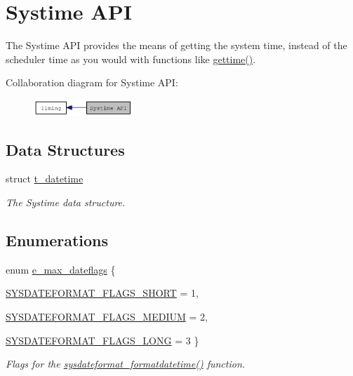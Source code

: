 \hypertarget{group__systime}{
\section{Systime API}
\label{group__systime}
}


The Systime API provides the means of getting the system time, instead of the scheduler time as you would with functions like \hyperlink{group__clocks_gabe5d8b1c9f260d13734a328b2a60ff69}{gettime()}.  


Collaboration diagram for Systime API:\nopagebreak
\begin{figure}[H]
\begin{center}
\leavevmode
\includegraphics[width=106pt]{group__systime}
\end{center}
\end{figure}
\subsection*{Data Structures}
\begin{DoxyCompactItemize}
\item 
struct \hyperlink{structt__datetime}{t\_\-datetime}
\begin{DoxyCompactList}\small\item\em The Systime data structure. \item\end{DoxyCompactList}\end{DoxyCompactItemize}
\subsection*{Enumerations}
\begin{DoxyCompactItemize}
\item 
enum \hyperlink{group__systime_ga26a8d02aa000843530dcb2d350766951}{e\_\-max\_\-dateflags} \{ \par
\hyperlink{group__systime_gga26a8d02aa000843530dcb2d350766951a03c806745c3aad02d768797ead649e20}{SYSDATEFORMAT\_\-FLAGS\_\-SHORT} =  1, 
\par
\hyperlink{group__systime_gga26a8d02aa000843530dcb2d350766951a44be9bae61adf4f4b802989465768d63}{SYSDATEFORMAT\_\-FLAGS\_\-MEDIUM} =  2, 
\par
\hyperlink{group__systime_gga26a8d02aa000843530dcb2d350766951a0cdecdf057e390773e60c3d71de7faf4}{SYSDATEFORMAT\_\-FLAGS\_\-LONG} =  3
 \}
\begin{DoxyCompactList}\small\item\em Flags for the \hyperlink{group__systime_ga6219d6f6543e65431086c34c35199e82}{sysdateformat\_\-formatdatetime()} function. \item\end{DoxyCompactList}\end{DoxyCompactItemize}
